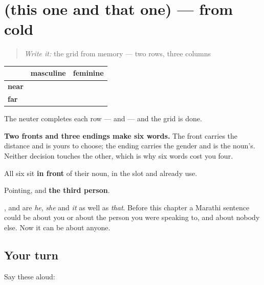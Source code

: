 \section[(this one and that one)]{(this one and that one) — from cold}

\label{lesson:MR-R69-dem-recall}



\begin{quote}
\emph{Write it:} the grid from memory — two rows, three columns
\end{quote}

\begin{grammarlens}[title={Grammar Lens: four letters, six words}]
\noindent
\begin{tabularx}{\linewidth}{@{}>{\raggedright\arraybackslash}X>{\raggedright\arraybackslash}X>{\raggedright\arraybackslash}X@{}}
\toprule
\textbf{} & \textbf{masculine} & \textbf{feminine} \\
\midrule
\textbf{near} & \textbf{\mr{हा}} & \textbf{\mr{ही}} \\
\textbf{far} & \textbf{\mr{तो}} & \textbf{\mr{ती}} \\
\bottomrule
\end{tabularx}

The neuter completes each row — \textbf{} and \textbf{} — and the grid is done.

\textbf{Two fronts and three endings make six words.} The front carries the distance and is yours to choose; the ending carries the gender and is the noun's. Neither decision touches the other, which is why six words cost you four.

All six sit \textbf{in front} of their noun, in the slot  and  already use.
\end{grammarlens}

\begin{grammarlens}[title={What you've built}]
Pointing, and \textbf{the third person}.

\textbf{}, \textbf{} and \textbf{} are \emph{he}, \emph{she} and \emph{it} as well as \emph{that}. Before this chapter a Marathi sentence could be about you or about the person you were speaking to, and about nobody else. Now it can be about anyone.
\end{grammarlens}

\subsection*{Your turn}
Say these aloud:

